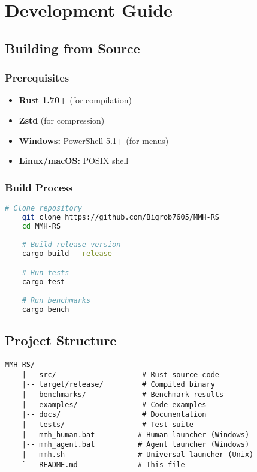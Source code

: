 \documentclass[11pt,a4paper]{article}
\begin{document}
	\section{Development Guide}
	\label{sec:development}

	\subsection{Building from Source}

	\subsubsection{Prerequisites}
	\begin{itemize}
		\item \textbf{Rust 1.70+} (for compilation)
		\item \textbf{Zstd} (for compression)
		\item \textbf{Windows:} PowerShell 5.1+ (for menus)
		\item \textbf{Linux/macOS:} POSIX shell
	\end{itemize}

	\subsubsection{Build Process}
	\begin{lstlisting}[language=bash]
	# Clone repository
	git clone https://github.com/Bigrob7605/MMH-RS
	cd MMH-RS

	# Build release version
	cargo build --release

	# Run tests
	cargo test

	# Run benchmarks
	cargo bench
	\end{lstlisting}

	\subsection{Project Structure}
	\begin{lstlisting}[basicstyle=\ttfamily\small]
	MMH-RS/
	|-- src/                    # Rust source code
	|-- target/release/         # Compiled binary
	|-- benchmarks/             # Benchmark results
	|-- examples/               # Code examples
	|-- docs/                   # Documentation
	|-- tests/                  # Test suite
	|-- mmh_human.bat          # Human launcher (Windows)
	|-- mmh_agent.bat          # Agent launcher (Windows)
	|-- mmh.sh                 # Universal launcher (Unix)
	`-- README.md              # This file
	\end{lstlisting}
\end{document}
